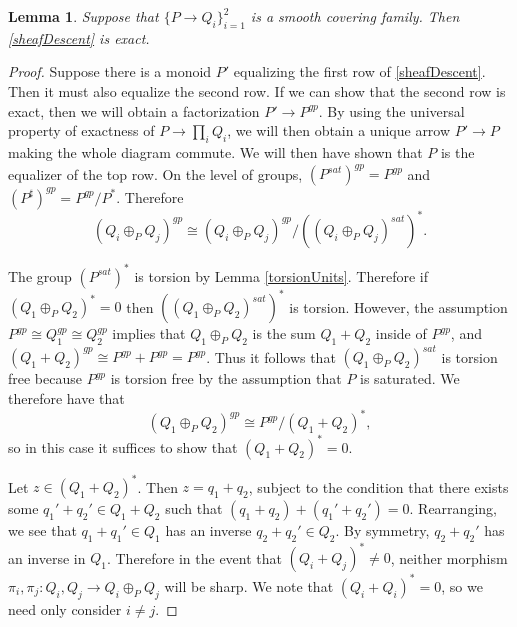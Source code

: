 \documentclass[12pt]{amsart}
\numberwithin{equation}{section}
\theoremstyle{plain}
\newtheorem{lem}[equation]{Lemma}
\theoremstyle{remark}
\begin{document}
\begin{lem}\label{twoElementCover}
	Suppose that $\{P\to Q_i\}_{i=1}^2$ is a smooth covering family. Then \eqref{sheafDescent} is exact.
\end{lem}
\begin{proof}
Suppose there is a monoid $P'$ equalizing the first row of \eqref{sheafDescent}. Then it must also equalize the second row. If we can show that the second row is exact, then we will obtain a factorization $P'\to P^{gp}$. By using the universal property of exactness of $P\to \prod_i Q_i$, we will then obtain a unique arrow $P'\to P$ making the whole diagram commute. We will then have shown that $P$ is the equalizer of the top row. On the level of groups, $(P^{sat})^{gp} = P^{gp}$ and $(P^{\sharp})^{gp} = P^{gp}/P^*$. Therefore 
	$$(Q_i\oplus_P Q_j)^{gp} \cong (Q_i\oplus_P Q_j)^{gp}/((Q_i\oplus_P Q_j)^{sat})^*.$$

The group $(P^{sat})^*$ is torsion by Lemma \eqref{torsionUnits}. Therefore if $(Q_1\oplus_P Q_2)^* = 0$ then $((Q_1\oplus_P Q_2)^{sat})^*$ is torsion. However, the assumption $P^{gp}\cong Q_1^{gp}\cong Q_2^{gp}$ implies that $Q_1\oplus _P Q_2$ is the sum $Q_1 + Q_2$ inside of $P^{gp}$, and $(Q_1 + Q_2)^{gp} \cong P^{gp} + P^{gp} = P^{gp}$. Thus it follows that $(Q_1\oplus_P Q_2)^{sat}$ is torsion free because $P^{gp}$ is torsion free by the assumption that $P$ is saturated. We therefore have that
\begin{equation}\label{sameGroupQuotient}
	(Q_1\oplus_P Q_2)^{gp} \cong P^{gp}/(Q_1 + Q_2)^*,
\end{equation}	
so in this case it suffices to show that $(Q_1 + Q_2)^* = 0$.

Let $z\in (Q_1 + Q_2)^*$. Then $z = q_1 +q_2$, subject to the condition that there exists some $q_1' + q_2'\in Q_1 + Q_2$ such that $(q_1 + q_2) + (q_1' + q_2') = 0$. Rearranging, we see that $q_1 + q_1'\in Q_1 $ has an inverse $q_2 + q_2'\in Q_2$. By symmetry, $q_2+q_2'$ has an inverse in $Q_1$. Therefore in the event that $(Q_i + Q_j)^*\neq 0$, neither morphism $\pi_i,\pi_j:Q_i,Q_j \to Q_i\oplus_P Q_j$ will be sharp. We note that $(Q_i +Q_i)^* = 0$, so we need only consider $i\neq j$. 


\end{proof}
\end{document}
